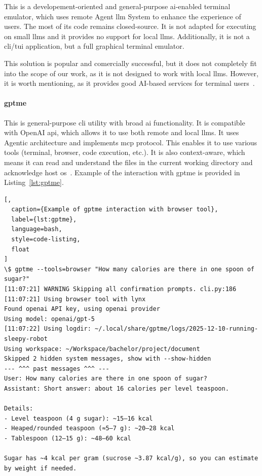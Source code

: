 This is a developement-oriented and general-purpose \gls{ai}-enabled terminal
emulator, which uses remote Agent \gls{llm} System to enhance the experience of
users. The most of its code remains closed-source. It is not adapted for
executing on small \glspl{llm} and it provides no support for local \glspl{llm}.
Additionally, it is not a \gls{cli}/\gls{tui} application, but a full
graphical terminal emulator.

This solution is popular and comercially successful, but it does not
completely fit into the scope of our work, as it is not designed to work with
local \glspl{llm}. However, it is worth mentioning, as it provides good AI-based
services for terminal users~\cite{warp-web,warp-docs}.

\paragraph{gptme}

This is general-purpose \gls{cli} utility with broad \gls{ai}
functionality. It is compatible with OpenAI \gls{api}, which allows
it to use both remote and local \glspl{llm}. It uses Agentic
architecture and implements \gls{mcp} protocol. This enables it to
use various tools (terminal, browser, code execution, etc.). It is
also context-aware, which means it can read and understand the files
in the current working directory and acknowledge host
\gls{os}~\cite{gptme-web,gptme-docs}. Example of the interaction with
gptme is provided in Listing~\ref{lst:gptme}.

\begin{lstlisting}[,
  caption={Example of gptme interaction with browser tool},
  label={lst:gptme},
  language=bash,
  style=code-listing,
  float
]
\$ gptme --tools=browser "How many calories are there in one spoon of sugar?"
[11:07:21] WARNING Skipping all confirmation prompts. cli.py:186
[11:07:21] Using browser tool with lynx
Found openai API key, using openai provider
Using model: openai/gpt-5
[11:07:22] Using logdir: ~/.local/share/gptme/logs/2025-12-10-running-sleepy-robot
Using workspace: ~/Workspace/bachelor/project/document
Skipped 2 hidden system messages, show with --show-hidden
--- ^^^ past messages ^^^ ---
User: How many calories are there in one spoon of sugar?
Assistant: Short answer: about 16 calories per level teaspoon.

Details:
- Level teaspoon (4 g sugar): ~15–16 kcal
- Heaped/rounded teaspoon (≈5–7 g): ~20–28 kcal
- Tablespoon (12–15 g): ~48–60 kcal

Sugar has ~4 kcal per gram (sucrose ~3.87 kcal/g), so you can estimate by weight if needed.
\end{lstlisting}

